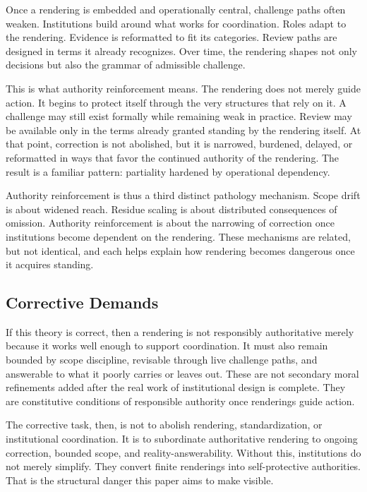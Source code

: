 \documentclass[11pt]{article}
\begin{document}
Once a rendering is embedded and operationally central, challenge paths often weaken. Institutions build around what works for coordination. Roles adapt to the rendering. Evidence is reformatted to fit its categories. Review paths are designed in terms it already recognizes. Over time, the rendering shapes not only decisions but also the grammar of admissible challenge.\cite{Power1997AuditSociety,Lipsky1980StreetLevelBureaucracy,MoynihanHerdHarvey2015AdministrativeBurden,Swanson2026MediatedJudgmentConstraint}

This is what authority reinforcement means. The rendering does not merely guide action. It begins to protect itself through the very structures that rely on it. A challenge may still exist formally while remaining weak in practice. Review may be available only in the terms already granted standing by the rendering itself. At that point, correction is not abolished, but it is narrowed, burdened, delayed, or reformatted in ways that favor the continued authority of the rendering. The result is a familiar pattern: partiality hardened by operational dependency.

Authority reinforcement is thus a third distinct pathology mechanism. Scope drift is about widened reach. Residue scaling is about distributed consequences of omission. Authority reinforcement is about the narrowing of correction once institutions become dependent on the rendering. These mechanisms are related, but not identical, and each helps explain how rendering becomes dangerous once it acquires standing.

\subsection{Corrective Demands}

If this theory is correct, then a rendering is not responsibly authoritative merely because it works well enough to support coordination. It must also remain bounded by scope discipline, revisable through live challenge paths, and answerable to what it poorly carries or leaves out. These are not secondary moral refinements added after the real work of institutional design is complete. They are constitutive conditions of responsible authority once renderings guide action.\cite{Swanson2026MediatedJudgmentConstraint,Swanson2026ConstrainedDescribability}

The corrective task, then, is not to abolish rendering, standardization, or institutional coordination. It is to subordinate authoritative rendering to ongoing correction, bounded scope, and reality-answerability. Without this, institutions do not merely simplify. They convert finite renderings into self-protective authorities. That is the structural danger this paper aims to make visible.
\end{document}
